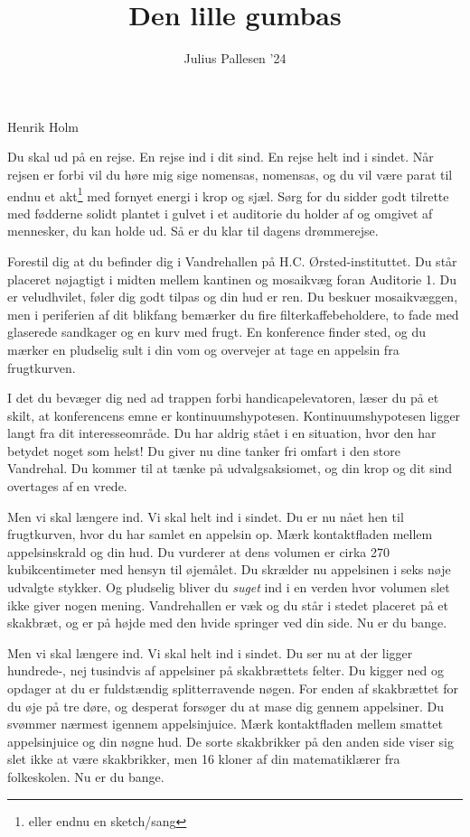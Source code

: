 \documentclass[a4paper,11pt]{article}
\title{Den lille gumbas}
\author{Julius Pallesen '24}
\begin{document}
\maketitle

\begin{roles}
 Henrik Holm
\end{roles}


\begin{sketch}

 Du skal ud på en rejse. En rejse ind i dit sind. En rejse helt ind i sindet. Når rejsen er forbi vil du høre mig sige nomensas, nomensas, og du vil være parat til endnu et akt\footnote{eller endnu en sketch/sang} med fornyet energi i krop og sjæl. Sørg for du sidder godt tilrette med fødderne solidt plantet i gulvet i et auditorie du holder af og omgivet af mennesker, du kan holde ud. Så er du klar til dagens drømmerejse.

 Forestil dig at du befinder dig i Vandrehallen på H.C. Ørsted-instituttet. Du står placeret nøjagtigt i midten mellem kantinen og mosaikvæg foran Auditorie 1. Du er veludhvilet, føler dig godt tilpas og din hud er ren. Du beskuer mosaikvæggen, men i periferien af dit blikfang bemærker du fire filterkaffebeholdere, to fade med glaserede sandkager og en kurv med frugt. En konference finder sted, og du mærker en pludselig sult i din vom og overvejer at tage en appelsin fra frugtkurven.

 I det du bevæger dig ned ad trappen forbi handicapelevatoren, læser du på et skilt, at konferencens emne er kontinuumshypotesen. Kontinuumshypotesen ligger langt fra dit interesseområde. Du har aldrig stået i en situation, hvor den har betydet noget som helst! Du giver nu dine tanker fri omfart i den store Vandrehal. Du kommer til at tænke på udvalgsaksiomet, og din krop og dit sind overtages af en vrede.

 Men vi skal længere ind. Vi skal helt ind i sindet. Du er nu nået hen til frugtkurven, hvor du har samlet en appelsin op. Mærk kontaktfladen mellem appelsinskrald og din hud. Du vurderer at dens volumen er cirka 270 kubikcentimeter med hensyn til øjemålet. Du skrælder nu appelsinen i seks nøje udvalgte stykker. Og pludselig bliver du \textit{suget} ind i en verden hvor volumen slet ikke giver nogen mening. Vandrehallen er væk og du står i stedet placeret på et skakbræt, og er på højde med den hvide springer ved din side. Nu er du bange.

 Men vi skal længere ind. Vi skal helt ind i sindet. Du ser nu at der ligger hundrede-, nej tusindvis af appelsiner på skakbrættets felter. Du kigger ned og opdager at du er fuldstændig splitterravende nøgen. For enden af skakbrættet for du øje på tre døre, og desperat forsøger du at mase dig gennem appelsiner. Du svømmer nærmest igennem appelsinjuice. Mærk kontaktfladen mellem smattet appelsinjuice og din nøgne hud. De sorte skakbrikker på den anden side viser sig slet ikke at være skakbrikker, men 16 kloner af din matematiklærer fra folkeskolen. Nu er du bange.


\end{sketch}
\end{document}
